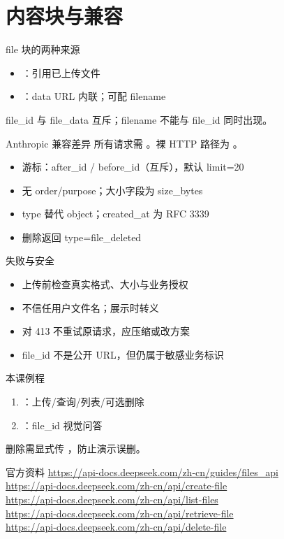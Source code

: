 \documentclass[aspectratio=169,UTF8]{ctexbeamer}
\begin{document}
\section{内容块与兼容}
\begin{frame}{file 块的两种来源}
\begin{itemize}
  \item {}：引用已上传文件
  \item {}：data URL 内联；可配 filename
\end{itemize}
file\_id 与 file\_data 互斥；filename 不能与 file\_id 同时出现。
\end{frame}
\begin{frame}{Anthropic 兼容差异}
\small
所有请求需 。裸 HTTP 路径为 。
\begin{itemize}
  \item 游标：after\_id / before\_id（互斥），默认 limit=20
  \item 无 order/purpose；大小字段为 size\_bytes
  \item type 替代 object；created\_at 为 RFC 3339
  \item 删除返回 type=file\_deleted
\end{itemize}
\end{frame}
\begin{frame}{失败与安全}
\begin{itemize}
  \item 上传前检查真实格式、大小与业务授权
  \item 不信任用户文件名；展示时转义
  \item 对 413 不重试原请求，应压缩或改方案
  \item file\_id 不是公开 URL，但仍属于敏感业务标识
\end{itemize}
\end{frame}
\begin{frame}{本课例程}
\begin{enumerate}
  \item {}：上传/查询/列表/可选删除
  \item {}：file\_id 视觉问答
\end{enumerate}
删除需显式传 ，防止演示误删。
\end{frame}
\begin{frame}{官方资料}
\small
\url{https://api-docs.deepseek.com/zh-cn/guides/files_api}\\
\url{https://api-docs.deepseek.com/zh-cn/api/create-file}\\
\url{https://api-docs.deepseek.com/zh-cn/api/list-files}\\
\url{https://api-docs.deepseek.com/zh-cn/api/retrieve-file}\\
\url{https://api-docs.deepseek.com/zh-cn/api/delete-file}
\end{frame}
\end{document}
